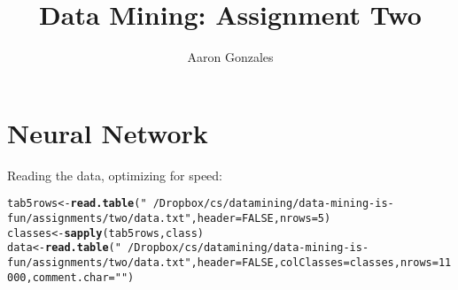 \documentclass[titlepage]{article}\usepackage[]{graphicx}\usepackage[]{color}
\makeatletter
\newcommand{\hlnum}[1]{\textcolor[rgb]{0.686,0.059,0.569}{#1}}%
\newcommand{\hlstr}[1]{\textcolor[rgb]{0.192,0.494,0.8}{#1}}%
\newcommand{\hlstd}[1]{\textcolor[rgb]{0.345,0.345,0.345}{#1}}%
\newcommand{\hlkwb}[1]{\textcolor[rgb]{0.69,0.353,0.396}{#1}}%
\newcommand{\hlkwc}[1]{\textcolor[rgb]{0.333,0.667,0.333}{#1}}%
\newcommand{\hlkwd}[1]{\textcolor[rgb]{0.737,0.353,0.396}{\textbf{#1}}}%
\newenvironment{kframe}{%
 \def\at@end@of@kframe{}%
 \ifinner\ifhmode%
  \def\at@end@of@kframe{\end{minipage}}%
  \begin{minipage}{\columnwidth}%
 \fi\fi%
 \def\FrameCommand##1{\hskip\@totalleftmargin \hskip-\fboxsep
 \colorbox{shadecolor}{##1}\hskip-\fboxsep
     \hskip-\linewidth \hskip-\@totalleftmargin \hskip\columnwidth}%
 \MakeFramed {\advance\hsize-\width
   \@totalleftmargin\z@ \linewidth\hsize
   \@setminipage}}%
 {\par\unskip\endMakeFramed%
 \at@end@of@kframe}
\newenvironment{knitrout}{}{} %
\makeatother
\begin{document}
\title{Data Mining: Assignment Two}
\author{Aaron Gonzales}
\maketitle





\section{Neural Network}

Reading the data, optimizing for speed:
\begin{knitrout}
\color{fgcolor}\begin{kframe}
\begin{alltt}
\hlstd{tab5rows} \hlkwb{<-} \hlkwd{read.table}\hlstd{(}\hlstr{"~/Dropbox/cs/datamining/data-mining-is-fun/assignments/two/data.txt"}\hlstd{,} \hlkwc{header} \hlstd{=} \hlnum{FALSE}\hlstd{,} \hlkwc{nrows} \hlstd{=} \hlnum{5}\hlstd{)}
\hlstd{classes} \hlkwb{<-} \hlkwd{sapply}\hlstd{(tab5rows, class)}
\hlstd{data} \hlkwb{<-} \hlkwd{read.table}\hlstd{(}\hlstr{"~/Dropbox/cs/datamining/data-mining-is-fun/assignments/two/data.txt"}\hlstd{,} \hlkwc{header} \hlstd{=} \hlnum{FALSE}\hlstd{,} \hlkwc{colClasses} \hlstd{= classes,} \hlkwc{nrows} \hlstd{=} \hlnum{11000}\hlstd{,} \hlkwc{comment.char}\hlstd{=}\hlstr{""}\hlstd{)}
\end{alltt}
\end{kframe}
\end{knitrout}

\subsection {}
\end{document}
